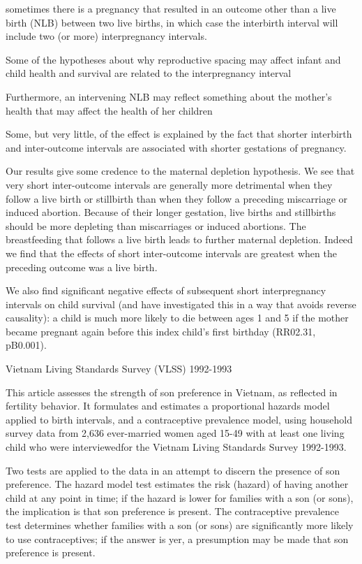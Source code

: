 sometimes there is a pregnancy that resulted in an outcome other than a
live birth (NLB) between two live births, in which case the interbirth
interval will include two (or more) interpregnancy intervals.

Some of the hypotheses about why reproductive spacing may affect infant
and child health and survival are related to the interpregnancy interval

Furthermore, an intervening NLB may reflect something about the mother’s
health that may affect the health of her children

Some, but very little, of the effect is explained by the fact that
shorter interbirth and inter-outcome intervals are associated with
shorter gestations of pregnancy.

Our results give some credence to the maternal depletion hypothesis.
We see that very short inter-outcome intervals are generally more
detrimental when they follow a live birth or stillbirth than when they
follow a preceding miscarriage or induced abortion. Because of their
longer gestation, live births and stillbirths should be more depleting
than miscarriages or induced abortions.
The breastfeeding that follows a live birth leads to further maternal
depletion. Indeed we find that the effects of short inter-outcome
intervals are greatest when the preceding outcome was a live birth.

We also find significant negative effects of subsequent short
interpregnancy intervals on child survival (and have investigated this
in a way that avoids reverse causality): a child is much more likely to
die between ages 1 and 5 if the mother became pregnant again before this
index child’s first birthday (RR02.31, pB0.001).

\citep{Haughton1995}

Vietnam Living Standards Survey (VLSS) 1992-1993

This article assesses the strength of son preference in Vietnam, as reflected in fertility behavior. It
formulates and estimates a proportional hazards model applied to birth intervals, and a contraceptive
prevalence model, using household survey data from 2,636 ever-married women aged 15-49 with at
least one living child who were interviewedfor the Vietnam Living Standards Survey 1992-1993.

 Two tests are applied to the data in an attempt to discern the presence of son preference. The hazard
model test estimates the risk (hazard) of having another
child at any point in time; if the hazard is lower for families with a son (or sons),
the implication is that son preference is present. The contraceptive prevalence test
determines whether families with a son (or sons) are significantly more likely to use
contraceptives; if the answer is yer, a presumption may be made that son preference is present.

